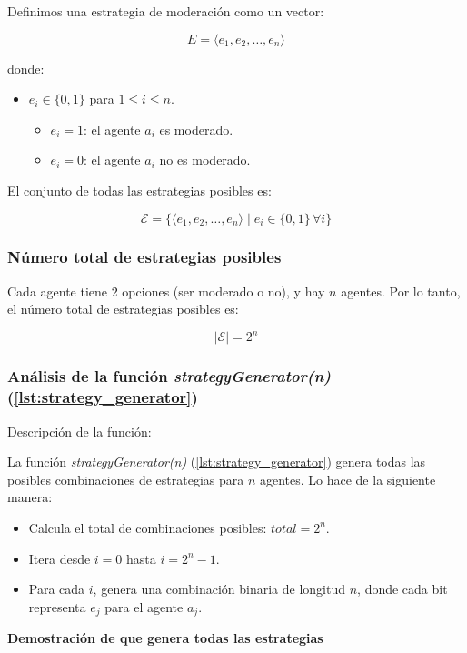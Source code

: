 \documentclass[letterpaper,10pt]{article}
\begin{document}
Definimos una estrategia de moderación como un vector:

\[
E = \langle e_1, e_2, \dots, e_n \rangle
\]

donde:
\begin{itemize}
  \item $e_i \in \{0, 1\}$ para $1 \leq i \leq n$.
  \begin{itemize}
    \item $e_i = 1$: el agente $a_i$ es moderado.
    \item $e_i = 0$: el agente $a_i$ no es moderado.
  \end{itemize}
\end{itemize}

El conjunto de todas las estrategias posibles es:

\[
\mathcal{E} = \{\langle e_1, e_2, \dots, e_n \rangle \mid e_i \in \{0, 1\} \, \forall i\}
\]

\subsubsection*{Número total de estrategias posibles}

Cada agente tiene 2 opciones (ser moderado o no), y hay $n$ agentes. Por lo tanto, el número total de estrategias posibles es:

\[
|\mathcal{E}| = 2^n
\]

\subsubsection*{Análisis de la función \textit{strategyGenerator(n)} (\ref{lst:strategy_generator})}

Descripción de la función:

La función \textit{strategyGenerator(n)} (\ref{lst:strategy_generator}) genera todas las posibles combinaciones de estrategias para $n$ agentes. Lo hace de la siguiente manera:

\begin{itemize}
    \item Calcula el total de combinaciones posibles: $total = 2^n$.
    \item Itera desde $i = 0$ hasta $i = 2^n - 1$.
    \item Para cada $i$, genera una combinación binaria de longitud $n$, donde cada bit representa $e_j$ para el agente $a_j$.
\end{itemize}

\textbf{Demostración de que genera todas las estrategias}
\\
\end{document}
